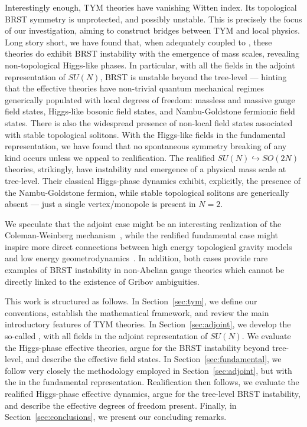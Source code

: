 \documentclass[../main.tex]{subfiles}
\begin{document}
Interestingly enough, TYM theories have vanishing Witten index. Its topological BRST symmetry is unprotected, and possibly unstable. This is precisely the focus of our investigation, aiming to construct bridges between TYM and local physics. Long story short, we have found that, when adequately coupled to , these theories do exhibit BRST instability with the emergence of mass scales, revealing non-topological Higgs-like phases. In particular, with all the fields in the adjoint representation of $SU(N)$, BRST is unstable beyond the tree-level --- hinting that the effective theories have non-trivial quantum mechanical regimes generically populated with local degrees of freedom: massless and massive gauge field states, Higgs-like bosonic field states, and Nambu-Goldstone fermionic field states. There is also the widespread presence of non-local field states associated with stable topological solitons. With the Higgs-like fields  in the fundamental representation, we have found that no spontaneous symmetry breaking of any kind occurs unless we appeal to realification. The realified $SU(N) \hookrightarrow SO(2N)$ theories, strikingly, have instability and emergence of a physical mass scale at tree-level. Their classical Higgs-phase dynamics exhibit, explicitly, the presence of the Nambu-Goldstone fermion, while stable topological solitons are generically absent --- just a single vertex/monopole is present in $N=2$.

We speculate that the adjoint case might be an interesting realization of the Coleman-Weinberg mechanism~\cite{coleman1973a}, while the realified fundamental case might inspire more direct connections between high energy topological gravity models and low energy geometrodynamics~\cite{sako1997a,mielke2011a,alexander2016a,sadovski2017a,chengzheng2017a,agrawal2020a,edery2023a,tianyao2023a,kehagias2021a,raitio2024a,sadovski2025a}. In addition, both cases provide rare examples of BRST instability in non-Abelian gauge theories which cannot be directly linked to the existence of Gribov ambiguities.

This work is structured as follows. In Section~\ref{sec:tym}, we define our conventions, establish the mathematical framework, and review the main introductory features of TYM theories. In Section~\ref{sec:adjoint}, we develop the so-called , with all fields in the adjoint representation of $SU(N)$. We evaluate the Higgs-phase effective theories, argue for the BRST instability beyond tree-level, and describe the effective field states. In Section~\ref{sec:fundamental}, we follow very closely the methodology employed in Section~\ref{sec:adjoint}, but with the  in the fundamental representation. Realification then follows, we evaluate the realified Higgs-phase effective dynamics, argue for the tree-level BRST instability, and describe the effective degrees of freedom present. Finally, in Section~\ref{sec:conclusions}, we present our concluding remarks.
\end{document}
